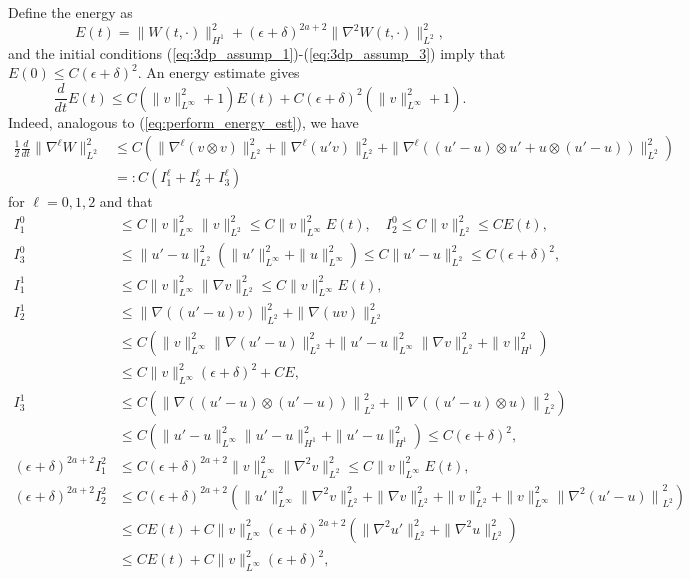 \documentclass[reqno,10pt]{amsart}
\theoremstyle{definition}
\theoremstyle{remark}
\numberwithin{equation}{section}
\begin{document}
Define the energy as
\[
    E(t) = \|W(t,\cdot)\|_{H^1}^2 + (\epsilon+\delta)^{2a+2} \|\nabla^2 W(t,\cdot)\|_{L^2}^2,
\]
and the initial conditions (\ref{eq:3dp_assump_1})-(\ref{eq:3dp_assump_3}) imply that $E(0)\le C(\epsilon+\delta)^2$. An energy estimate gives
\begin{equation} \label{eq:energy_est_3}
    \frac{d}{dt}E(t) \le C\left(\|v\|_{L^\infty}^2+1\right)E(t) + C\left(\epsilon+\delta\right)^2(\|v\|_{L^\infty}^2+1).
\end{equation}
Indeed, analogous to (\ref{eq:perform_energy_est}), we have
\[ 
\begin{aligned}
    \frac{1}{2}\frac{d}{dt}\|\nabla^\ell W\|_{L^2}^2 &\le  C\left(\|\nabla^\ell (v\otimes v)\|_{L^2}^2 + \|\nabla^\ell (u'v)\|_{L^2}^2 + \|\nabla^\ell \left((u'-u)\otimes u'+u\otimes (u'-u)\right)\|_{L^2}^2 \right) \\
    &=:C\left( I^\ell_1 + I^\ell_2 + I^\ell_3 \right) 
\end{aligned}
\]
for $\ell=0,1,2$ and that
\[
\begin{aligned}
    I^0_1 &\le C\|v\|_{L^\infty}^2\|v\|_{L^2}^2 \le C\|v\|_{L^\infty}^2E(t), \quad
    I^0_2 \le C\|v\|_{L^2}^2 \le CE(t), \\
    I^0_3 &\le  \|u'-u\|_{L^2}^2 \left( \|u'\|_{L^\infty}^2+\|u\|_{L^\infty}^2 \right) \le C \|u'-u\|_{L^2}^2 \le C(\epsilon+\delta)^2, \\
    I^1_1 &\le C \|v\|_{L^\infty}^2 \|\nabla v\|_{L^2}^2 \le C\|v\|_{L^\infty}^2 E(t), \\
    I^1_2 & \le \| \nabla \left((u'-u) v \right)\|_{L^2}^2 + \|\nabla(uv)\|_{L^2}^2 \\ 
    &\le C \left( \|v\|_{L^\infty}^2 \|\nabla(u'-u)\|_{L^2}^2 + \|u'-u\|_{L^\infty}^2 \|\nabla v\|_{L^2}^2 + \|v\|_{H^1}^2 \right) \\
    &\le C\|v\|_{L^\infty}^2 (\epsilon+\delta)^2 + CE, \\
    I^1_3 &\le C\left( {\| \nabla\left( (u'-u)\otimes (u'-u) \right)\|}_{L^2}^2 + {\| \nabla\left( (u'-u)\otimes u \right)\|}_{L^2}^2 \right) \\
    & \le C\left(\|u'-u\|_{L^\infty}^2\|u'-u\|_{H^1}^2 + \|u'-u\|_{H^1}^2\right) \le C(\epsilon+\delta)^2, \\
    (\epsilon+\delta)^{2a+2}I^2_1 &\le  C(\epsilon+\delta)^{2a+2} \|v\|_{L^\infty}^2\|\nabla^2 v\|_{L^2}^2 \le C\|v\|_{L^\infty}^2 E(t), \\
    (\epsilon+\delta)^{2a+2}I^2_2 &\le C(\epsilon+\delta)^{2a+2} \left( \|u'\|_{L^\infty}^2 \|\nabla^2v\|_{L^2}^2 + \|\nabla v\|_{L^2}^2 + \|v\|_{L^2}^2 + \|v\|_{L^\infty}^2 {\| \nabla^2(u'-u)\|}_{L^2}^2 \right) \\
    &\le CE(t) + C\|v\|_{L^\infty}^2 (\epsilon+\delta)^{2a+2}\left( \|\nabla^2 u'\|_{L^2}^2 + \|\nabla^2 u\|_{L^2}^2 \right) \\
    &\le CE(t) + C\|v\|_{L^\infty}^2 (\epsilon+\delta)^2,
\end{aligned}
\]
\end{document}

